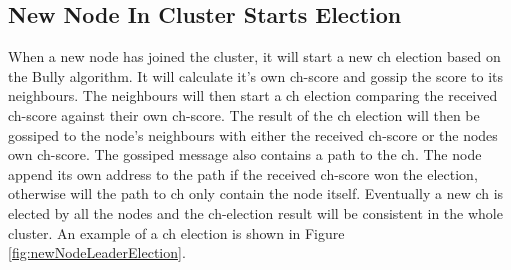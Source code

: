 \documentclass[USenglish]{uit-thesis}
\begin{document}
\subsection{New Node In Cluster Starts Election}
When a new node has joined the cluster, it will start a new \gls{ch} election based on the Bully algorithm. It will calculate it's own \gls{ch}-score and gossip the score to its neighbours. The neighbours will then start a \gls{ch} election comparing the received \gls{ch}-score against their own \gls{ch}-score. The result of the \gls{ch} election will then be gossiped to the node's neighbours with either the received \gls{ch}-score or the nodes own \gls{ch}-score. The gossiped message also contains a path to the \gls{ch}. The node append its own address to the path if the received \gls{ch}-score won the election, otherwise will the path to \gls{ch} only contain the node itself. Eventually a new \gls{ch} is elected by all the nodes and the \gls{ch}-election result will be consistent in the whole cluster. An example of a \gls{ch} election is shown in Figure \ref{fig:newNodeLeaderElection}.
\end{document}
